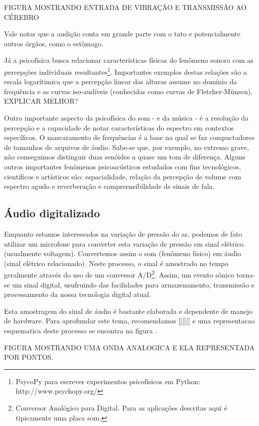 FIGURA MOSTRANDO ENTRADA DE VIBRAÇÃO E TRANSMISSÃO AO CÉREBRO

Vale notar que a audição conta em grande parte com o tato e potencialmente
outros órgãos, como o estômago.

Já a psicofísica busca relacionar características físicas do fenômeno sonoro
com as percepções individuais resultantes\footnote{PsycoPy para escrever experimentos psicofísicos em Python: http://www.psychopy.org/}.
Importantes exemplos destas relações
são a escala logarítimica que a percepção linear das alturas assume no
domínio da frequência e as curvas iso-audíveis (conhecidas como curvas de Fletcher-Münsen).
EXPLICAR MELHOR?

Outro importante aspecto da psicofísica do som - e da música - é a resolução da percepção
e a capacidade de notar características do espectro em contextos específicos. O mascaramento
de frequências é a base na qual se faz compactadores de tamanhos de arquivos de áudio. Sabe-se
que, por exemplo, no extremo grave, não conseguimos distinguir duas senóides a quase um tom de
diferença. Alguns outros importantes fenômenos psicoacústicos estudados com fins tecnológicos, científicos e artísticos são: espacialidade,
relação da percepção de volume com espectro agudo e reverberação e compreensibilidade de sinais de fala.


\subsection{Áudio digitalizado}
Enquanto estamos interessados na variação de pressão do ar, podemos de fato utilizar
um microfone para converter esta variação de pressão em sinal elétrico (usualmente voltagem).
Convertemos assim o som (fenômeno físico) em áudio (sinal elétrico relacionado).
Neste processo, o sinal é amostrado no tempo geralmente através do uso de
um conversor A/D\footnote{Conversor Analógico para Digital. Para as aplicações descritas aqui é tipicamente uma placa som.}. Assim, um evento sônico
torna-se um sinal digital, usufruindo das facilidades para armazenamento, transmissão e
processamento da nossa tecnologia digital atual.

Esta amostragem do sinal de áudio é bastante elaborada e dependente de manejo de hardware. Para
aprofundar este tema, recomendamos [][][] e uma representacao esquematica deste processo
se encontra na figura .

FIGURA MOSTRANDO UMA ONDA ANALOGICA E ELA REPRESENTADA POR PONTOS.

